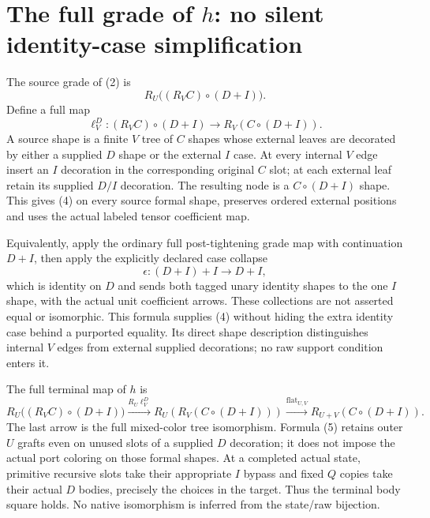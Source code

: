 \documentclass[11pt]{article}\usepackage{amsmath,amssymb,amsthm,geometry}\geometry{margin=1in}\newtheorem{theorem}{Theorem}
\begin{document}
\section{The full grade of $h$: no silent identity-case simplification}
The source grade of (2) is
\[
                        R_U\bigl((R_VC)\circ(D+I)\bigr).       \tag{3}
\]
Define a full map
\[
 \ell_V^D:(R_VC)\circ(D+I)\longrightarrow R_V(C\circ(D+I)).  \tag{4}
\]
A source shape is a finite $V$ tree of $C$ shapes whose external leaves are decorated by either a supplied $D$ shape or the external $I$ case. At every internal $V$ edge insert an $I$ decoration in the corresponding original $C$ slot; at each external leaf retain its supplied $D/I$ decoration. The resulting node is a $C\circ(D+I)$ shape. This gives (4) on every source formal shape, preserves ordered external positions and uses the actual labeled tensor coefficient map.

Equivalently, apply the ordinary full post-tightening grade map with continuation $D+I$, then apply the explicitly declared case collapse
\[
                    \epsilon:(D+I)+I\longrightarrow D+I,
\]
which is identity on $D$ and sends both tagged unary identity shapes to the one $I$ shape, with the actual unit coefficient arrows. These collections are not asserted equal or isomorphic. This formula supplies (4) without hiding the extra identity case behind a purported equality. Its direct shape description distinguishes internal $V$ edges from external supplied decorations; no raw support condition enters it.

The full terminal map of $h$ is
\[
 R_U\bigl((R_VC)\circ(D+I)\bigr)
 \xrightarrow{R_U\ell_V^D}R_U(R_V(C\circ(D+I)))
 \xrightarrow{\mathrm{flat}_{U,V}}R_{U+V}(C\circ(D+I)).       \tag{5}
\]
The last arrow is the full mixed-color tree isomorphism. Formula (5) retains outer $U$ grafts even on unused slots of a supplied $D$ decoration; it does not impose the actual port coloring on those formal shapes. At a completed actual state, primitive recursive slots take their appropriate $I$ bypass and fixed $Q$ copies take their actual $D$ bodies, precisely the choices in the target. Thus the terminal body square holds. No native isomorphism is inferred from the state/raw bijection.
\end{document}
